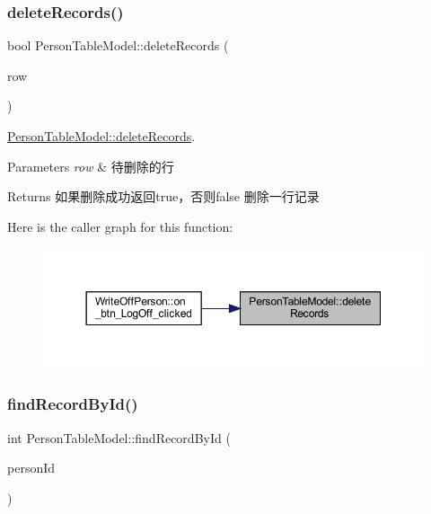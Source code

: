 \subsubsection{\texorpdfstring{deleteRecords()}{deleteRecords()}}
{\footnotesize\ttfamily bool Person\+Table\+Model\+::delete\+Records (\begin{DoxyParamCaption}\item[{int}]{row }\end{DoxyParamCaption})}



\mbox{\hyperlink{class_person_table_model_a23ae24fe86e68f54a2d3259c924e122c}{Person\+Table\+Model\+::delete\+Records}}. 


\begin{DoxyParams}{Parameters}
{\em row} & 待删除的行 \\
\hline
\end{DoxyParams}
\begin{DoxyReturn}{Returns}
如果删除成功返回true，否则false 删除一行记录 
\end{DoxyReturn}
Here is the caller graph for this function\+:
\nopagebreak
\begin{figure}[H]
\begin{center}
\leavevmode
\includegraphics[width=350pt]{class_person_table_model_a23ae24fe86e68f54a2d3259c924e122c_icgraph}
\end{center}
\end{figure}
\mbox{\label{class_person_table_model_afd1547d0c85e360bad55b08aa0f4e338}} 
\subsubsection{\texorpdfstring{findRecordById()}{findRecordById()}}
{\footnotesize\ttfamily int Person\+Table\+Model\+::find\+Record\+By\+Id (\begin{DoxyParamCaption}\item[{const Q\+String}]{person\+Id }\end{DoxyParamCaption})}




